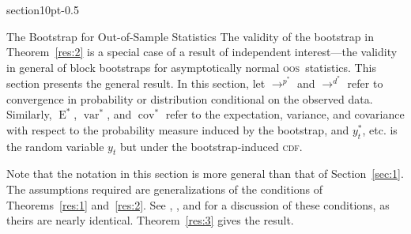 \documentclass[10pt,fleqn,draft]{article}
\makeatletter
\renewcommand\section{\@startsection%
{section}{1}{0pt}{-\baselineskip}{0.5\baselineskip}%
{\normalfont\normalsize\bfseries\large\raggedright}}
\theoremstyle{definition}
\DeclareMathOperator{\E}{E}
\DeclareMathOperator{\var}{var}
\DeclareMathOperator{\cov}{cov}
\newcommand{\cdf}{\textsc{cdf}}
\newcommand{\oos}{\textsc{oos}}
\makeatother
\begin{document}
\section{The Bootstrap for Out-of-Sample Statistics}\label{sec:1b}
The validity of the bootstrap in Theorem~\ref{res:2} is a special case
of a result of independent interest---the validity in general of block
bootstraps for asymptotically normal \oos\ statistics.  This section
presents the general result.  In this section, let $\to^{p^{*}}$ and
$\to^{d^{*}}$ refer to convergence in probability or distribution
conditional on the observed data.  Similarly, $\E^{*}$, $\var^{*}$,
and $\cov^{*}$ refer to the expectation, variance, and covariance with
respect to the probability measure induced by the bootstrap, and
$y_t^{*}$, etc. is the random variable $y_t$ but under the
bootstrap-induced \cdf.

Note that the notation in this section is more general than that of
Section~\ref{sec:1}.  The assumptions required are generalizations of
the conditions of Theorems~\ref{res:1} and~\ref{res:2}.  See
\citet{Wes:96,Wes:06}, \citet{WeM:98}, and \citet{Mcc:00} for a
discussion of these conditions, as theirs are nearly identical.
Theorem~\ref{res:3} gives the result.
\end{document}

